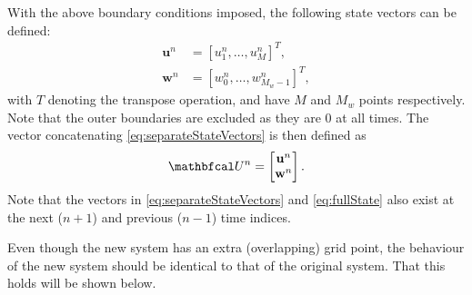 With the above boundary conditions imposed, the following state vectors can be defined:
\begin{equation}
    \begin{aligned}\label{eq:separateStateVectors}
     \mathbf{u}^n &= [u_1^n, \hdots, u_M^n]^T, \\
     \mathbf{w}^n &= [w_0^n, \hdots, w_{M_w-1}^n]^T,
    \end{aligned}
\end{equation}
with $T$ denoting the transpose operation, and have $M$ and $M_{w}$ points respectively. Note that the outer boundaries are excluded as they are 0 at all times. The vector concatenating \eqref{eq:separateStateVectors} is then defined as 
\begin{equation}\label{eq:fullState}
    \U^n = \begin{bmatrix}
        \mathbf{u}^n \\
        \mathbf{w}^n
    \end{bmatrix}.
\end{equation}
Note that the vectors in \eqref{eq:separateStateVectors} and \eqref{eq:fullState} also exist at the next ($n+1$) and previous ($n-1$) time indices. 

Even though the new system has an extra (overlapping) grid point, the behaviour of the new system should be identical to that of the original system. That this holds will be shown below.

